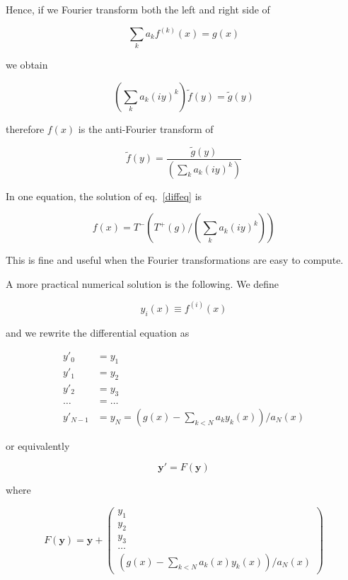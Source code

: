 \documentclass[justified,sixbynine]{tufte-book}
\theoremstyle{plain}%
\theoremstyle{definition}
\theoremstyle{remark}
\begin{document}
\begin{fullwidth}
Hence, if we Fourier transform both the left and right side of

\begin{equation}
\sum _k a_k f^{(k)}(x) = g(x)
\end{equation}

we obtain

\begin{equation}
(\sum _k a_k (i y)^k) \tilde f(y) = \tilde g(y)
\end{equation}

therefore $f(x)$ is the anti-Fourier transform of

\begin{equation}
\tilde f(y) = \frac{\tilde g(y)}{(\sum _k a_k (i y)^k)}
\end{equation}

In one equation, the solution of eq.~\ref{diffeq} is

\begin{equation}
f(x) = T^-(T^+(g)/(\sum _k a_k (iy)^k))
\end{equation}

This is fine and useful when the Fourier transformations are easy to compute.

A more practical numerical solution is the following. We define

\begin{equation}
y_i(x) \equiv f^{(i)}(x)
\end{equation}

and we rewrite the differential equation as

\begin{align}
y'_0 &= y_1 \\
y'_1 &= y_2 \\
y'_2 &= y_3 \\
\dots &= \dots \\
y'_{N-1} &= y_N = (g(x)-\sum_{k<N} a_k y_k(x))/a_N(x)
\end{align}

or equivalently

\begin{equation}
\mathbf{y}' = F(\mathbf{y})
\end{equation}

where

\begin{equation}
F(\mathbf{y}) = \mathbf{y}+\begin{pmatrix}
y_1 \\
y_2 \\
y_3 \\
\dots \\
(g(x)-\sum_{k<N} a_k(x)y_k(x))/a_N(x)
\end{pmatrix}
\end{equation}


\end{fullwidth}
\end{document}
